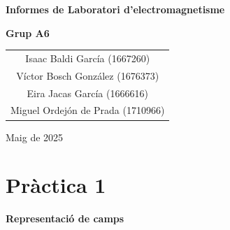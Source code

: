 \documentclass[11pt]{article}
\numberwithin{equation}{section}
\numberwithin{figure}{section}
\numberwithin{table}{section}
\begin{document}
\begin{titlepage}
    \centering
    \vspace*{\fill}

    {\Huge \bfseries Informes de Laboratori d'electromagnetisme\par}
    \vspace{2cm}
    
    {\Large \textbf{Grup A6}\par}
    \vspace{1cm}
    
    {\Large
    \begin{tabular}{c}
    Isaac Baldi García (1667260)\\
    Víctor Bosch González (1676373) \\
    Eira Jacas García (1666616) \\
    Miguel Ordejón de Prada (1710966)
    
    \end{tabular}
    }
    
    \vspace{1cm}

    {\large Maig de 2025\par}

    \vspace*{\fill}
\end{titlepage}

\tableofcontents
\newpage
\vspace{10em}
\section{\huge \textbf{Pràctica 1}}  %

\vspace{0.5em}  %

{\Huge \textbf{Representació de camps}}  %

\vspace{2em}  %

\end{document}
